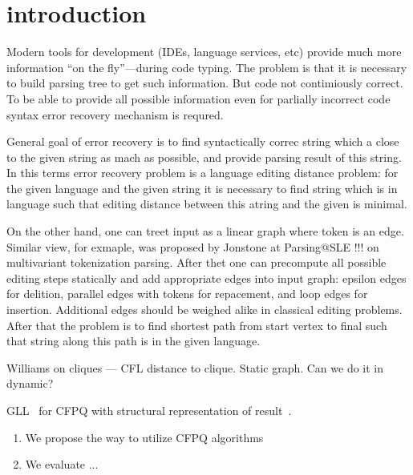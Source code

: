 \section{introduction}

Modern tools for development (IDEs, language services, etc) provide much more information ``on the fly''---during code typing.
The problem is that it is necessary to build parsing tree to get such information.
But code not contimiously correct.
To be able to provide all possible information even for parlially incorrect code syntax error recovery mechanism is requred.

General goal of error recovery is to find syntactically correc string which a close to the given string as mach as possible, and provide parsing result of this string.
In this terms error recovery problem is a language editing distance problem: for the given language and the given string it is necessary to find string which is in language such that editing distance between this atring and the given is minimal.

On the other hand, one can treet input as a linear graph where token is an edge.
Similar view, for exmaple, was proposed by Jonstone at Parsing@SLE !!! on multivariant tokenization parsing.
After thet one can precompute all possible editing steps statically and add appropriate edges into input graph: epsilon edges for delition, parallel edges with tokens for repacement, and loop edges for insertion.
Additional edges should be weighed alike in classical editing problems.
After that the problem is to find shortest path from start vertex to final such that string along this path is in the given language.

Williams on cliques --- CFL distance to clique.
Static graph.
Can we do it in dynamic?

GLL~\cite{scott2010gll} for CFPQ with structural representation of result~\cite{GrigorevR16}.

\begin{enumerate}
\item We propose the way to utilize CFPQ algorithms
\item We evaluate ...
\end{enumerate}
